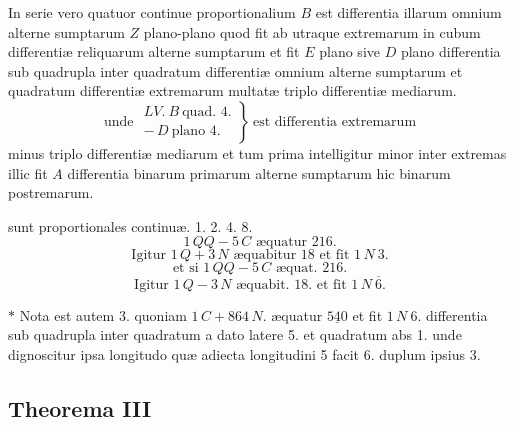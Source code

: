 \documentclass[11pt,a4paper]{article}
\begin{document}
In serie vero quatuor continue proportionalium $B$  est differentia illarum omnium alterne sumptarum $Z$ plano-plano quod fit ab utraque extremarum in cubum differentiæ reliquarum alterne sumptarum et fit $E$ plano sive $D$ plano differentia sub quadrupla inter quadratum differentiæ omnium alterne sumptarum et quadratum differentiæ extremarum multatæ triplo differentiæ mediarum.
\[ \text{unde } \left.\begin{array}{l} LV.\ B\ \text{quad. } \boxed{4}. \\ -\,D\ \text{plano } \boxed{4}. \end{array}\right\}\ \text{est differentia extremarum} \]
minus triplo differentiæ mediarum et tum prima intelligitur minor inter extremas illic fit $A$ differentia binarum primarum alterne sumptarum hic binarum postremarum.

sunt proportionales continuæ. 1. 2. 4. 8.
\marginal{$+$}
\[ 1\,QQ - 5\,C \text{ æquatur } 216. \]
\[ \text{Igitur } 1\,Q + 3\,N \text{ æquabitur } 18 \text{ et fit } 1\,N\ 3. \]
\[ \text{et si } 1\,QQ - 5\,C \text{ æquat. } 216. \]
\[ \text{Igitur } 1\,Q - 3\,N \text{ æquabit. } 18. \text{ et fit } 1\,N\ \overline{6}. \]

$*$ Nota est autem 3. quoniam $1\,C + 864\,N$. æquatur $\underline{540}$ et fit $1\,N\ 6$. differentia sub quadrupla inter quadratum a dato latere 5. et quadratum abs 1. unde dignoscitur ipsa longitudo quæ adiecta longitudini 5 facit 6. duplum ipsius 3.

\subsection*{Theorema III}
\end{document}

